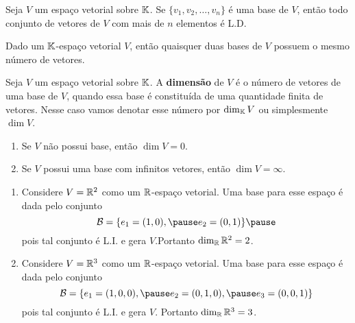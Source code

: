 \documentclass{beamer}
\begin{document}
\begin{frame}
  \begin{teorema}
    Seja $V$ um espaço vetorial sobre $\mathbb{K}$. \pause Se $\{v_1, v_2, \dots, v_n\}$ é uma base de $V$, \pause então todo conjunto de vetores de $V$ \pause com mais de $n$ elementos \pause é L.D.\pause
  \end{teorema}

  \begin{corolario}
    Dado um $\mathbb{K}$-espaço vetorial $V$, \pause então quaisquer duas bases de $V$ possuem o mesmo número de vetores.
  \end{corolario}
\end{frame}

\begin{frame}
  \begin{definicao}
    Seja $V$ um espaço vetorial sobre $\mathbb{K}$. \pause A \textbf{dimensão} de $V$ \pause é o número de vetores de uma base de $V$, \pause quando essa base é constituída de uma quantidade finita de vetores. \pause
    Nesse caso vamos denotar esse número por $\dim_{\mathbb{K}}V$ \pause ou simplesmente $\dim V$.\pause
  \end{definicao}

  \begin{observacoes}
    \begin{enumerate}[label={\roman*})]
      \item Se $V$ não possui base, \pause então $\dim V = 0$.\pause

      \item Se $V$ possui uma base com infinitos vetores, \pause então $\dim V = \infty$.
    \end{enumerate}
  \end{observacoes}
\end{frame}

\begin{frame}
    \begin{exemplos}
        \begin{enumerate}[label={\roman*})]
            \item Considere $V = \mathbb{R}^2$ como um $\mathbb{R}$-espaço vetorial. \pause Uma base para esse espaço é dada pelo conjunto \pause
            \[
                \mathcal{B} = \{e_1 = (1, 0), \pause e_2 = (0, 1)\}\pause
            \]
            pois tal conjunto é L.I. \pause e gera $V$.\pause Portanto $\dim_{\mathbb{R}}\mathbb{R}^2 = 2$.\pause

            \vspace*{1cm}

            \item Considere $V = \mathbb{R}^3$ como um $\mathbb{R}$-espaço vetorial. \pause Uma base para esse espaço é dada pelo conjunto
            \[
                \mathcal{B} = \{e_1 = (1, 0, 0), \pause e_2 = (0, 1, 0), \pause e_3 = (0, 0, 1)\}
            \] \pause pois tal conjunto é L.I. \pause e gera $V$. \pause Portanto $\dim_{\mathbb{R}}\mathbb{R}^3 = 3$.
            \seti
        \end{enumerate}
    \end{exemplos}
\end{frame}
\end{document}

